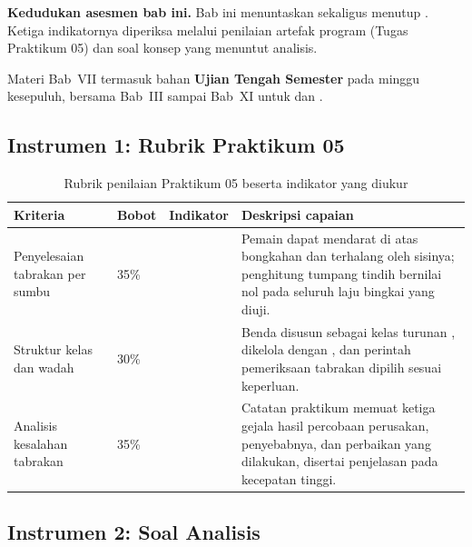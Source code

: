 \label{sec:asesmen-tabrakan}

\begin{asesmenbox}
\textbf{Kedudukan asesmen bab ini.} Bab ini menuntaskan  sekaligus
menutup . Ketiga indikatornya diperiksa melalui penilaian artefak
program (Tugas Praktikum 05) dan soal konsep yang menuntut analisis.

\vspace{0.4em}
Materi Bab~VII termasuk bahan \textbf{Ujian Tengah Semester} pada minggu
kesepuluh, bersama Bab~III sampai Bab~XI untuk  dan .
\end{asesmenbox}

\subsection*{Instrumen 1: Rubrik Praktikum 05}

\begin{table}[htbp]
\centering
\caption{Rubrik penilaian Praktikum 05 beserta indikator yang diukur}
\label{tab:rubrik-praktikum-05}
{\setlength{\tabcolsep}{4pt}\footnotesize%
\begin{tabularx}{\textwidth}{@{}L{3.2cm} C{1.3cm} C{2.1cm} Y@{}}
\toprule
\headrow \textbf{Kriteria} & \textbf{Bobot} & \textbf{Indikator} & \textbf{Deskripsi capaian} \\
\midrule
Penyelesaian tabrakan per sumbu & 35\% &  &
Pemain dapat mendarat di atas bongkahan dan terhalang oleh sisinya; penghitung
tumpang tindih bernilai nol pada seluruh laju bingkai yang diuji. \\
\addlinespace
Struktur kelas dan wadah & 30\% &  &
Benda disusun sebagai kelas turunan , dikelola dengan
, dan perintah pemeriksaan tabrakan dipilih sesuai keperluan. \\
\addlinespace
Analisis kesalahan tabrakan & 35\% &  &
Catatan praktikum memuat ketiga gejala hasil percobaan perusakan, penyebabnya,
dan perbaikan yang dilakukan, disertai penjelasan pada kecepatan tinggi. \\
\bottomrule
\end{tabularx}}
\end{table}

\subsection*{Instrumen 2: Soal Analisis}

